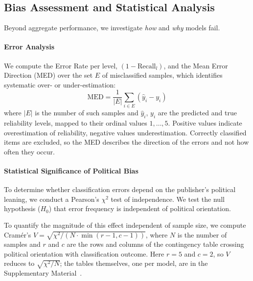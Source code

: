\documentclass[runningheads]{llncs}
\begin{document}
\subsection{Bias Assessment and Statistical Analysis}\label{subsec:bias_methodology}
Beyond aggregate performance, we investigate \textit{how} and \textit{why} models fail.

\paragraph{Error Analysis}

We compute the Error Rate per level, $(1 - \mathrm{Recall}_l)$, and the Mean Error Direction (MED) over the set $E$ of misclassified samples, which identifies systematic over- or under-estimation:
\begin{equation}
\mathrm{MED} = \frac{1}{|E|} \sum_{i \in E} (\hat{y}_i - y_i)
\end{equation}
where $|E|$ is the number of such samples and $\hat{y}_i$, $y_i$ are the predicted and true reliability levels, mapped to their ordinal values $1,\dots,5$. Positive values indicate overestimation of reliability, negative values underestimation. Correctly classified items are excluded, so the MED describes the direction of the errors and not how often they occur.

\paragraph{Statistical Significance of Political Bias} To determine whether classification errors depend on the publisher's political leaning, we conduct a Pearson's $\chi^2$ test of independence. We test the null hypothesis ($H_0$) that error frequency is independent of political orientation.

To quantify the magnitude of this effect independent of sample size, we compute Cramér's $V = \sqrt{\chi^2 / (N \cdot \min(r-1,c-1))}$, where $N$ is the number of samples and $r$ and $c$ are the rows and columns of the contingency table crossing political orientation with classification outcome. Here $r=5$ and $c=2$, so $V$ reduces to $\sqrt{\chi^2/N}$; the tables themselves, one per model, are in the Supplementary Material~\cite{suppmaterial2026}.
\end{document}
